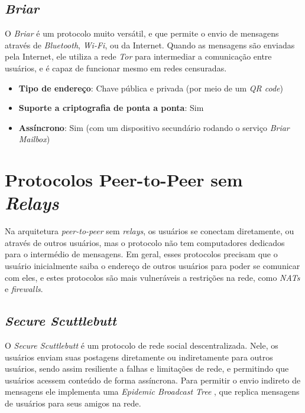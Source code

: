 \subsection{\textit{Briar}}

O \textit{Briar} é um protocolo muito versátil, e que permite o envio de mensagens através de \textit{Bluetooth}, \textit{Wi-Fi}, ou da Internet. Quando as mensagens são enviadas pela Internet, ele utiliza a rede \textit{Tor} para intermediar a comunicação entre usuários, e é capaz de funcionar mesmo em redes censuradas. \cite{briar}

\begin{itemize}
  \item \textbf{Tipo de endereço}: Chave pública e privada (por meio de um \textit{QR code})
  \item \textbf{Suporte a criptografia de ponta a ponta}: Sim
  \item \textbf{Assíncrono}: Sim (com um dispositivo secundário rodando o serviço \textit{Briar Mailbox})
\end{itemize}

\section{Protocolos Peer-to-Peer sem \textit{Relays}}

Na arquitetura \textit{peer-to-peer} sem \textit{relays}, os usuários se conectam diretamente, ou através de outros usuários, mas o protocolo não tem computadores dedicados para o intermédio de mensagens. Em geral, esses protocolos precisam que o usuário inicialmente saiba o endereço de outros usuários para poder se comunicar com eles, e estes protocolos são mais vulneráveis a restrições na rede, como \textit{NATs} e \textit{firewalls}.

\subsection{\textit{Secure Scuttlebutt}}

O \textit{Secure Scuttlebutt} é um protocolo de rede social descentralizada. Nele, os usuários enviam suas postagens diretamente ou indiretamente para outros usuários, sendo assim resiliente a falhas e limitações de rede, e permitindo que usuários acessem conteúdo de forma assíncrona. Para permitir o envio indireto de mensagens ele implementa uma \textit{Epidemic Broadcast Tree} \cite{ebtpaper}, que replica mensagens de usuários para seus amigos na rede. \cite{scuttlebutt}

